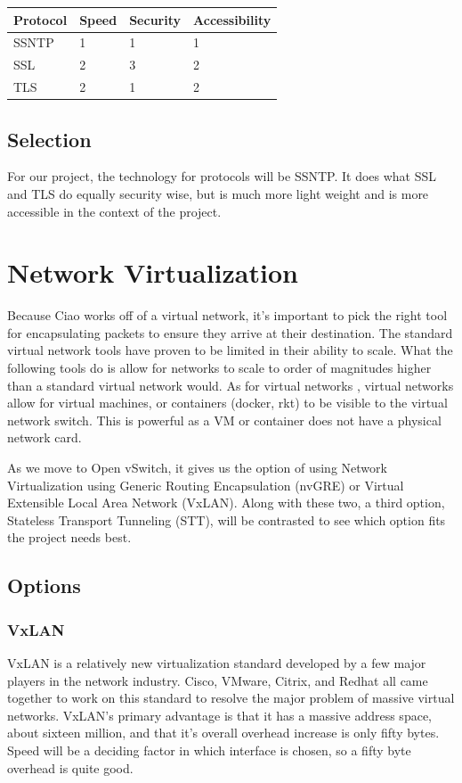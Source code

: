 \documentclass[10pt,letterpaper,onecolumn,draftclsnofoot]{IEEEtran}
\begin{document}
\begin{center}
	\begin{tabular}{| l | l | l | l |}
		\hline
		Protocol & Speed & Security & Accessibility \\ \hline
		SSNTP & 1 & 1 & 1 \\ \hline
		SSL & 2 & 3 & 2 \\ \hline
		TLS & 2 & 1 & 2 \\ \hline
	\end{tabular}
\end{center}

\subsection{Selection}
For our project, the technology for protocols will be SSNTP. It does what SSL
and TLS do equally security wise, but is much more light weight and is more
accessible in the context of the project.


\section{Network Virtualization}
Because Ciao works off of a virtual network, it's important to pick the right
tool for encapsulating packets to ensure they arrive at their destination. The
standard virtual network tools have proven to be limited in their ability to
scale. What the following tools do is allow for networks to scale to order of
magnitudes higher than a standard virtual network would. As for virtual networks
, virtual networks allow for virtual machines, or containers (docker, rkt) to be
visible to the virtual network switch. This is powerful as a VM or container
does not have a physical network card.

As we move to Open vSwitch, it gives us the option of using Network
Virtualization using Generic Routing Encapsulation (nvGRE) or Virtual Extensible
Local Area Network (VxLAN). Along with these two, a third option, Stateless
Transport Tunneling (STT), will be contrasted to see which option fits the
project needs best.

\subsection{Options}
\subsubsection{VxLAN}
VxLAN is a relatively new virtualization standard developed by a few major
players in the network industry. Cisco, VMware, Citrix, and Redhat all came
together to work on this standard to resolve the major problem of massive
virtual networks. VxLAN's primary advantage is that it has a massive address
space, about sixteen million, and that it's overall overhead increase is only
fifty bytes. \cite{vxlan} Speed will be a deciding factor in which interface
is chosen, so a fifty byte overhead is quite good.
\end{document}
